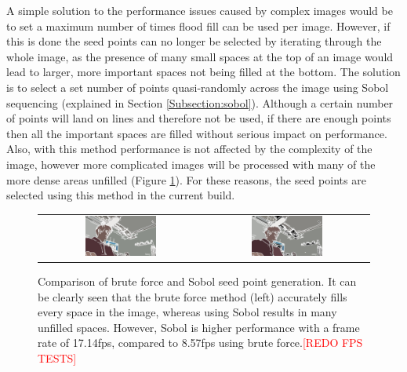A simple solution to the performance issues caused by complex images would be to set a maximum number of times flood fill can be used per image. However, if this is done the seed points can no longer be selected by iterating through the whole image, as the presence of many small spaces at the top of an image would lead to larger, more important spaces not being filled at the bottom. The solution is to select a set number of points quasi-randomly across the image using Sobol sequencing (explained in Section \ref{Subsection:sobol}). Although a certain number of points will land on lines and therefore not be used, if there are enough points then all the important spaces are filled without serious impact on performance. Also, with this method performance is not affected by the complexity of the image, however more complicated images will be processed with many of the more dense areas unfilled (Figure \ref{fig:BrutevsSobol}). For these reasons, the seed points are selected using this method in the current build.

\begin{figure}[H]
    \begin{center}
    \begin{tabular}{ c c }
        \includegraphics[width=0.45\textwidth]{Figures/Brute.jpg} &
        \includegraphics[width=0.45\textwidth]{Figures/Sobol.jpg}
    \end{tabular}
    \caption[Comparison of brute force and Sobol seed point generation]{Comparison of brute force and Sobol seed point generation. It can be clearly seen that the brute force method (left) accurately fills every space in the image, whereas using Sobol results in many unfilled spaces. However, Sobol is higher performance with a frame rate of 17.14fps, compared to 8.57fps using brute force.\textcolor{red}{[REDO FPS TESTS]}}
    \label{fig:BrutevsSobol}
    \end{center}
\end{figure}

